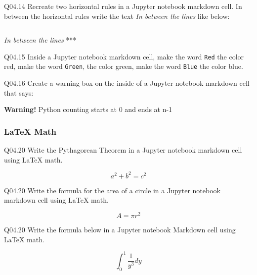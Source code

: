 \documentclass{book}
\newenvironment{problems}{}{}  %
\begin{document}
\begin{problems}
Q04.14 Recreate two horizontal rules in a Jupyter notebook markdown
cell. In between the horizontal rules write the text \emph{In between
the lines} like below:

\begin{center}\rule{0.5\linewidth}{\linethickness}\end{center}

\emph{In between the lines} ***

Q04.15 Inside a Jupyter notebook markdown cell, make the word
\lstinline!Red! the color red, make the word \lstinline!Green!, the
color green, make the word \lstinline!Blue! the color blue.

Q04.16 Create a warning box on the inside of a Jupyter notebook markdown
cell that says:

\textbf{Warning!} Python counting starts at 0 and ends at n-1
        \end{problems}

    




    
        \subsubsection{LaTeX Math}\label{latex-math}

Q04.20 Write the Pythagorean Theorem in a Jupyter notebook markdown cell
using LaTeX math.

\[ a^2 + b^2 = c^2 \]

Q04.20 Write the formula for the area of a circle in a Jupyter notebook
markdown cell using LaTeX math.

\[ A = \pi r^2 \]

Q04.20 Write the formula below in a Jupyter notebook Markdown cell using
LaTeX math.

\[ \int_{0}^{1} \frac{1}{y^3} dy \]
    
\end{document}
